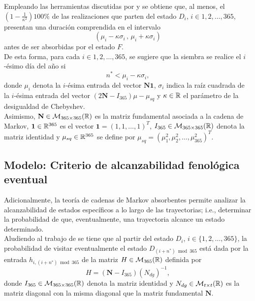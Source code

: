 Empleando las herramientas discutidas por \citet[Capítulo 11]{Grinstead_2003} y \citet[Capítulo 3]{Kemeny_1976}  se obtiene que, al menos, el $\displaystyle\left(1-\frac{1}{\kappa^2}\right)100\%$ de las realizaciones que parten del estado $D_i$, $i\in{1,2,\ldots,365}$, presentan una duración comprendida en el intervalo \begin{equation*}
	(\mu_i- \kappa \sigma_i \,\mathbf{,}\, \mu_i+\kappa\sigma_i)
\end{equation*} antes de ser absorbidas por el estado $F$.\\

De esta forma, para cada $i\in{1,2,\ldots,365}$, se sugiere que la siembra se realice el $i$-ésimo día del año si
\begin{equation}
	n^* < \mu_i- \kappa \sigma_i,
\end{equation} donde $\mu_i$ denota la $i$-ésima entrada del vector $ \mathbf{N} \mathbf{1}$, $\sigma_i$ indica la raíz cuadrada de la $i$-ésima entrada del vector $(2\mathbf{N} - I_{365})\mu -  \mu_{sq}$ y $\kappa\in\mathbb{R}$ el parámetro de la desigualdad de Chebyshev.\\

Asimismo, $\mathbf{N}\in \mathcal{M}_{365\times 365}(\mathbb{R})$ es la matriz fundamental asociada a la cadena de Markov,  $\mathbf{1}\in\mathbb{R}^{365}$ es el vector $\mathbf{1}=(1,1,\ldots,1)^T$, $I_{365}\in \mathcal{M}_{365\times 365}(\mathbb{R})$ denota la matriz identidad y $\mu_{sq}\in \mathbb{R}^{365}$ se define por $\mu_{sq}=(\mu^2_1,\mu^2_2,\ldots,\mu^2_{365})^T$.\\

\subsection{Modelo: Criterio de alcanzabilidad fenológica eventual}
Adicionalmente, la teoría de cadenas de Markov absorbentes permite analizar la alcanzabilidad de estados específicos a lo largo de las trayectorias; i.e., determinar la probabilidad de que, eventualmente, una trayectoria alcance un estado determinado.\\

Aludiendo al trabajo de \citet[Capítulo 3]{Kemeny_1976} se tiene que al  partir del estado $D_i$, $i\in \{1,2,\ldots,365\}$, la probabilidad de visitar eventualmente el estado $D_{(i+n^*)\bmod 365}$ está dada por la entrada $h_{i,(i+n^*)\bmod 365}$ de la matriz $H \in \mathcal{M}_{365\time 365} (\R)$ definida por \begin{equation*}
	H=(\mathbf{N}-I_{365})(N_{dg})^{-1},
	\end{equation*}
donde $I_{365}\in \mathcal{M}_{365\times 365}(\mathbb{R})$ denota la matriz identidad y $N_{dg}\in \mathcal{M}_{t\times t}(\mathbb{R})$ es la matriz diagonal con la misma diagonal que la matriz fundamental $\mathbf{N}$.\\

